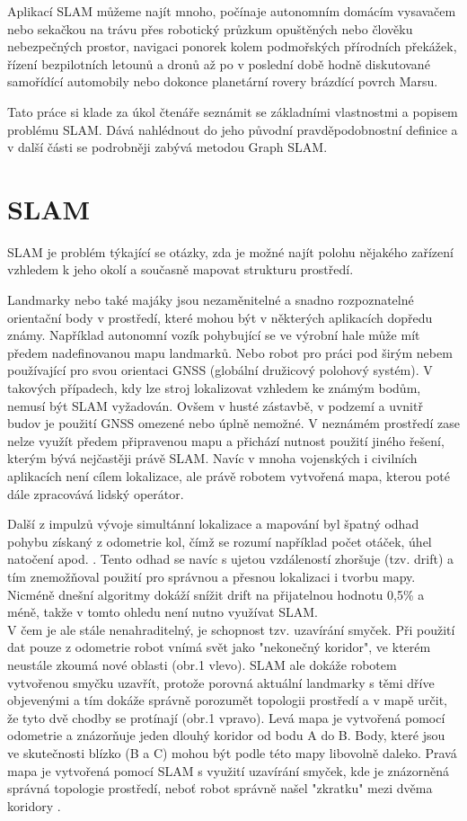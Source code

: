 \documentclass[12pt,a4paper]{article}
\begin{document}
Aplikací SLAM můžeme najít mnoho, počínaje autonomním domácím vysavačem nebo sekačkou na trávu přes robotický průzkum opuštěných nebo člověku nebezpečných prostor, navigaci ponorek kolem podmořských přírodních překážek, řízení bezpilotních letounů a dronů až po v poslední době hodně diskutované samořídící automobily nebo dokonce planetární rovery brázdící povrch Marsu.

Tato práce si klade za úkol čtenáře seznámit se základními vlastnostmi a popisem problému SLAM. Dává nahlédnout do jeho původní pravděpodobnostní definice a v další části se podrobněji zabývá metodou Graph SLAM. 


\newpage
\section{SLAM}
SLAM je problém týkající se otázky, zda je možné najít polohu nějakého zařízení vzhledem k jeho okolí a současně mapovat strukturu prostředí.

Landmarky nebo také majáky jsou nezaměnitelné a snadno rozpoznatelné orientační body v prostředí, které mohou být v některých aplikacích dopředu známy. Například autonomní vozík pohybující se ve výrobní hale může mít předem nadefinovanou mapu landmarků. Nebo robot pro práci pod širým nebem používající pro svou orientaci GNSS (globální družicový polohový systém). V takových případech, kdy lze stroj lokalizovat vzhledem ke známým bodům, nemusí být SLAM vyžadován. Ovšem v husté zástavbě, v podzemí a uvnitř budov je použití GNSS omezené nebo úplně nemožné. V neznámém prostředí zase nelze využít předem připravenou mapu a přichází nutnost použití jiného řešení, kterým bývá nejčastěji právě SLAM. Navíc v mnoha vojenských i civilních aplikacích není cílem lokalizace, ale právě robotem vytvořená mapa, kterou poté dále zpracovává lidský operátor.

Další z impulzů vývoje simultánní lokalizace a mapování byl špatný odhad pohybu získaný z odometrie kol, čímž se rozumí například počet otáček, úhel natočení apod. \cite{Past_Present_and_Future_of_Simultaneous_Localization_And_Mapping}. Tento odhad se navíc s ujetou vzdáleností zhoršuje (tzv. drift) a tím znemožňoval použití pro správnou a přesnou lokalizaci i tvorbu mapy. Nicméně dnešní algoritmy dokáží snížit drift na přijatelnou hodnotu 0,5\% a méně, takže v tomto ohledu není nutno využívat SLAM. \\ V čem je ale stále nenahraditelný, je schopnost tzv. uzavírání smyček. Při použití dat pouze z odometrie robot vnímá svět jako "nekonečný koridor", ve kterém neustále zkoumá nové oblasti (obr.1 vlevo). SLAM ale dokáže robotem vytvořenou smyčku uzavřít, protože porovná aktuální landmarky s těmi dříve objevenými a tím dokáže správně porozumět topologii prostředí a v mapě určit, že tyto dvě chodby se protínají (obr.1 vpravo). Levá mapa je vytvořená pomocí odometrie a znázorňuje jeden dlouhý koridor od bodu A do B. Body, které jsou ve skutečnosti blízko (B a C) mohou být podle této mapy libovolně daleko. Pravá mapa je vytvořená pomocí SLAM s využití uzavírání smyček, kde je znázorněná správná topologie prostředí, neboť robot správně našel "zkratku" mezi dvěma koridory \cite{Past_Present_and_Future_of_Simultaneous_Localization_And_Mapping}.
\end{document}

